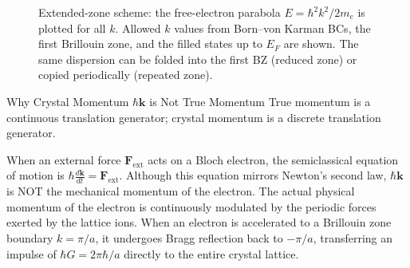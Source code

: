 \documentclass[11pt,a4paper]{article}
\newcommand{\vb}[1]{\mathbf{#1}}
\begin{document}
\begin{figure}[h]
\centering
{}
\caption{Extended-zone scheme: the free-electron parabola $E=\hbar^2k^2/2m_e$ is plotted for all $k$. Allowed $k$ values from Born--von Karman BCs, the first Brillouin zone, and the filled states up to $E_F$ are shown. The same dispersion can be folded into the first BZ (reduced zone) or copied periodically (repeated zone).}
\label{fig:zone_schemes}
\end{figure}

\begin{checkpointbox}{Why Crystal Momentum $\hbar\vb{k}$ is Not True Momentum}
True momentum is a continuous translation generator; crystal momentum is a discrete translation generator. 

When an external force $\vb{F}_{\mathrm{ext}}$ acts on a Bloch electron, the semiclassical equation of motion is $\hbar \frac{d\vb{k}}{dt} = \vb{F}_{\mathrm{ext}}$. Although this equation mirrors Newton's second law, $\hbar\vb{k}$ is NOT the mechanical momentum of the electron. The actual physical momentum of the electron is continuously modulated by the periodic forces exerted by the lattice ions. When an electron is accelerated to a Brillouin zone boundary $k = \pi/a$, it undergoes Bragg reflection back to $-\pi/a$, transferring an impulse of $\hbar G = 2\pi\hbar/a$ directly to the entire crystal lattice.
\end{checkpointbox}
\end{document}
